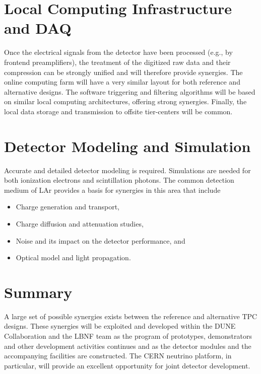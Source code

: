 \section{Local Computing Infrastructure and DAQ}

Once the electrical signals from the detector have been processed
(e.g., by frontend preamplifiers), the treatment of the digitized raw data and
their compression can be strongly unified and will therefore provide
synergies. The online computing farm will have a very similar layout
for both reference and alternative designs. The software triggering and
filtering algorithms will be based on similar local computing
architectures, offering strong synergies. Finally, the local data
storage and transmission to offsite tier-centers will be common.


\section{Detector Modeling and Simulation}

Accurate and detailed detector modeling is required.  Simulations are
needed for both ionization electrons and scintillation photons. The
common detection medium of
LAr provides a basis for synergies in this area that include
\begin{itemize}
\item Charge generation and transport,
\item Charge diffusion and attenuation studies,
\item Noise and its impact on the detector performance, and
\item Optical model and light propagation.
\end{itemize}

\section{Summary}
A large set of possible synergies exists between the reference and
alternative TPC designs. These synergies will be exploited and
developed within the DUNE Collaboration and the LBNF team as the
program of prototypes, demonstrators and other development activities
continues and as the detector modules and the accompanying facilities
are constructed. The CERN neutrino platform, in particular, will
provide an excellent opportunity for joint detector development.

